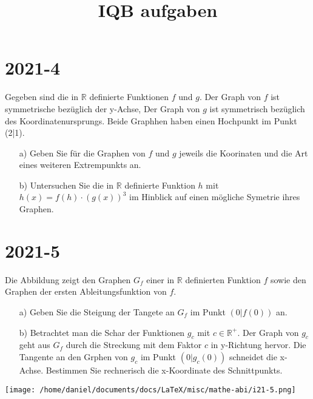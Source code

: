 \documentclass{article}
\title{IQB aufgaben}
\author{}
\date{}
\begin{document}
\maketitle

\section*{2021-4}
Gegeben sind die in $\mathbb{R}$ definierte Funktionen $f$ und $g$. Der Graph
von $f$ ist symmetrische bez\"uglich der y-Achse, Der Graph von $g$ ist
symmetrisch bez\"uglich des Koordinatenursprungs. Beide Graphhen haben einen
Hochpunkt im Punkt (2|1).

\begin{enumerate}
  \item[a)] Geben Sie f\"ur die Graphen von $f$ und $g$ jeweils die Koorinaten
    und die Art eines weiteren Extrempunkts an.

  \item[b)] Untersuchen Sie die in $\mathbb{R}$ definierte Funktion $h$ mit
    $h(x)=f(h)\cdot (g(x))^3$ im Hinblick auf einen m\"ogliche Symetrie ihres
    Graphen.

\end{enumerate}

\clearpage
\section*{2021-5}
\begin{minipage}{0.65\textwidth}
  Die Abbildung zeigt den Graphen $G_f$ einer in $\mathbb{R}$ definierten
  Funktion $f$ sowie den Graphen der ersten Ableitungsfunktion von $f$.

\begin{enumerate}
  \item[a)] Geben Sie die Steigung der Tangete an $G_f$ im Punkt $\left(0|f(0)\right)$ an.

  \item[b)] Betrachtet man die Schar der Funktionen $g_c$ mit $c\in
    \mathbb{R}^+$. Der Graph von $g_c$ geht aus $G_f$ durch die Streckung mit
    dem Faktor $c$ in y-Richtung hervor. Die Tangente an den Grphen von $g_c$
    im Punkt $(0|g_c(0))$ schneidet die x-Achse. Bestimmen Sie rechnerisch die
    x-Koordinate des Schnittpunkts.

\end{enumerate}

\end{minipage}
\hfill
\begin{minipage}{0.3\textwidth}
  \begin{center}
      \texttt{[image: /home/daniel/documents/docs/LaTeX/misc/mathe-abi/i21-5.png]}
  \end{center}
\end{minipage}
\end{document}
